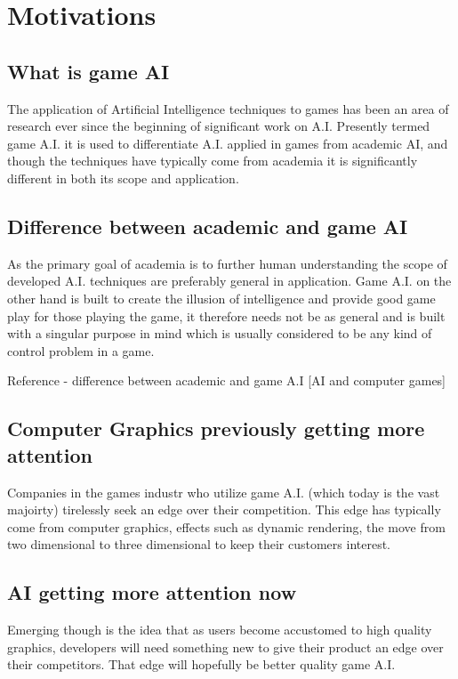 \documentclass[parskip]{cs4rep}
\begin{document}
\section{Motivations}

\subsection{What is game AI}

The application of Artificial Intelligence techniques to games has been an area of research ever since the beginning of significant work on A.I. Presently termed game A.I. it is used to differentiate A.I. applied in games from academic AI, and though the techniques have typically come from academia it is significantly different in both its scope and application.

\subsection{Difference between academic and game AI}

As the primary goal of academia is to further human understanding the scope of developed A.I. techniques are preferably general in application. Game A.I. on the other hand is built to create the illusion of intelligence and provide good game play for those playing the game, it therefore needs not be as general and is built with a singular purpose in mind which is usually considered to be any kind of control problem in a game.

Reference - difference between academic and game A.I [AI and computer games]

\subsection{Computer Graphics previously getting more attention}

Companies in the games industr who utilize game A.I. (which today is the vast majoirty) tirelessly seek an edge over their competition. This edge has typically come from computer graphics, effects such as dynamic rendering, the move from two dimensional to three dimensional to keep their customers interest. 

\subsection{AI getting more attention now}

Emerging though is the idea that as users become accustomed to high quality graphics, developers will need something new to give their product an edge over their competitors. That edge will hopefully be better quality game A.I.
\end{document}
